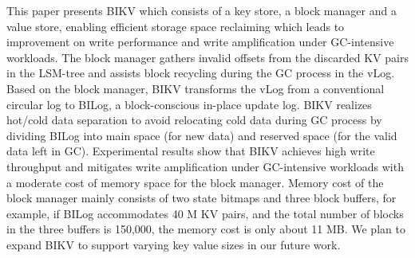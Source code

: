\documentclass[sigconf]{acmart}
\begin{document}
This paper presents BIKV which consists of a key store, a block manager and a value store, enabling efficient storage space reclaiming which leads to improvement on write performance and write amplification under GC-intensive workloads. The block manager gathers invalid offsets from the discarded KV pairs in the LSM-tree and assists block recycling during the GC process in the vLog. Based on the block manager, BIKV transforms the vLog from a conventional circular log to BILog, a block-conscious in-place update log. BIKV realizes hot/cold data separation to avoid relocating cold data during GC process by dividing BILog into main space (for new data) and reserved space (for the valid data left in GC). Experimental results show that BIKV achieves high write throughput and mitigates write amplification under GC-intensive workloads with a moderate cost of memory space for the block manager. Memory cost of the block manager mainly consists of two state bitmaps and three block buffers, for example, if BILog accommodates 40 M KV pairs, and the total number of blocks in the three buffers is 150,000, the memory cost is only about 11 MB. We plan to expand BIKV to support varying key value sizes in our future work. 

\end{document}
